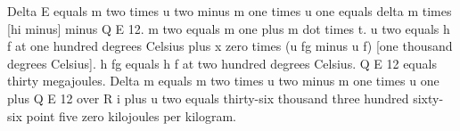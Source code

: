 Delta E equals m two times u two minus m one times u one equals delta m times [hi minus] minus Q E 12.  
m two equals m one plus m dot times t.  
u two equals h f at one hundred degrees Celsius plus x zero times (u fg minus u f) [one thousand degrees Celsius].  
h fg equals h f at two hundred degrees Celsius.  
Q E 12 equals thirty megajoules.  
Delta m equals m two times u two minus m one times u one plus Q E 12 over R i plus u two equals thirty-six thousand three hundred sixty-six point five zero kilojoules per kilogram.